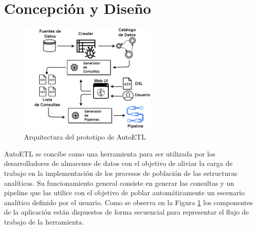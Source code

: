 \section{Concepción y Diseño}\label{section:design}

\begin{figure}
    \centering
    \includegraphics[width=0.60\textwidth]{Graphics/arch.drawio.png}
    \caption{Arquitectura del prototipo de AutoETL}
    \label{fig:arquitectura}
    \end{figure}

AutoETL se concibe como una herramienta para ser utilizada por los desarrolladores de almacenes de datos 
con el objetivo de aliviar la carga de trabajo en la implementación de los procesos de población de las 
estructuras analíticas. Su funcionamiento general consiste en generar las consultas y un pipeline que las utilice 
con el objetivo de poblar automáticamente un escenario analítico definido por el usuario. Como se observa en la 
Figura \ref{fig:arquitectura} los componentes de la aplicación 
est\'an dispuestos de forma secuencial para representar el flujo de trabajo de la herramienta.

